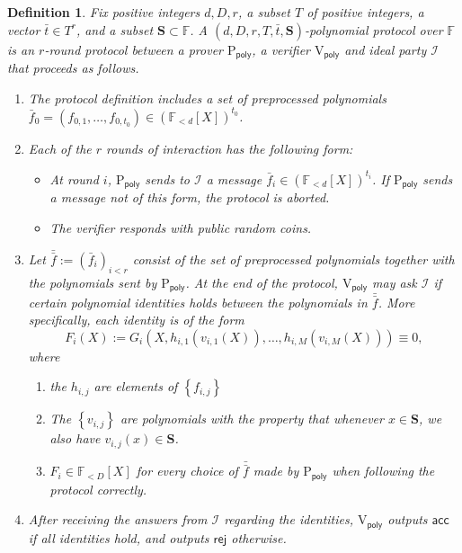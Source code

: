 \documentclass[11pt]{article} %
\newcommand{\F}{\ensuremath{\mathbb F}\xspace}
\newcommand{\vecc}[2]{\ensuremath{(#1)_{#2}}\xspace}
\newcommand{\rej}{\ensuremath{\mathsf{rej}}\xspace}
\newcommand{\acc}{\ensuremath{\mathsf{acc}}\xspace}
\newcommand{\defeq}{:=}
\newcommand{\prvpoly}{\ensuremath{\mathrm{P_{\mathsf{poly}}}}\xspace}
\newcommand{\verpoly}{\ensuremath{\mathrm{V_{\mathsf{poly}}}}\xspace}
\newcommand{\ideal}{\ensuremath{\mathcal{I}}\xspace}
\newcommand{\set}[1]{\ensuremath{\left\{#1\right\}}\xspace}
\newcommand{\polysofdeg}[1]{\ensuremath{\F_{< #1}[X]}\xspace}
\newcommand{\polyvecs}[2]{\ensuremath{(\F_{< #1}[X])^{#2}}\xspace}
\newtheorem{dfn}[lemma]{Definition}
\newcommand{\openset}{\ensuremath{\mathbf{S}}\xspace}
\newcommand{\f}{\ensuremath{\bar{f}}\xspace}
\renewcommand{\t}{\ensuremath{\bar{t}}\xspace}
\newcommand{\ff}{\ensuremath{\bar{\bar{f}}}\xspace}
\begin{document}
\begin{dfn}\label{dfn:polyprotocol}
Fix positive integers $d,D,r$, a subset $T$ of positive integers, a vector $\t\in T^r$, and a subset $\openset\subset \F$.
A \emph{$(d,D,r,T,\t,\openset)$-polynomial protocol} over \F is an $r$-round protocol between a prover \prvpoly, 
a verifier \verpoly and ideal party \ideal that proceeds as follows.

\begin{enumerate}
\item The protocol definition includes a set of \emph{preprocessed polynomials} $\f_0 = (f_{0,1},\ldots,f_{0,t_0}) \in \polyvecs{d}{t_0}$.
\item Each of the $r$ rounds of interaction has the following form:
\begin{itemize}

\item At round $i$, \prvpoly sends to \ideal a message $\f_i\in \polyvecs{d}{t_i}$.  If \prvpoly sends a message not of this form, the protocol is aborted.
\item The verifier responds with public random coins. 
\end{itemize}
 

 \item Let $\ff\defeq \vecc{\f_i}{i<r}$ consist of the set of preprocessed polynomials together with the polynomials sent by \prvpoly. At the end of the protocol, 
 \verpoly may ask \ideal if certain polynomial identities holds between the polynomials in \ff.
More specifically,  each identity is of the form
 \[F_i(X)\defeq G_i(X, h_{i,1}(v_{i,1}(X)),\ldots,h_{i,M}(v_{i,M}(X)))\equiv 0,\]
 where 
 \begin{enumerate}
  \item the $h_{i,j}$ are elements of \set{f_{i,j}}
  \item The \set{v_{i,j}} are polynomials with the property that whenever $x\in \openset$, we also have  $v_{i,j}(x)\in \openset$.
 \item $F_i\in \polysofdeg{D}$ for every choice of $\ff$ made by \prvpoly when following the protocol correctly.
 \end{enumerate}
 
 
 
 \item After receiving the answers from \ideal regarding the identities, \verpoly outputs \acc if all identities hold, and outputs \rej otherwise.

\end{enumerate}
 
\end{dfn}
\end{document}
